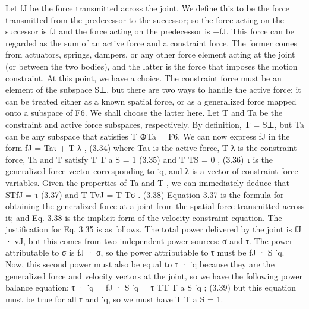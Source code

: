 Let fJ be the force transmitted across the joint. We define this to be the force transmitted from the predecessor to the successor; so the force acting on the successor is fJ and the force acting on the predecessor is −fJ. This force can be regarded as the sum of an active force and a constraint force. The former comes from actuators, springs, dampers, or any other force element acting at the joint (or between the two bodies), and the latter is the force that imposes the motion constraint. At this point, we have a choice. The constraint force must be an element of the subspace S⊥, but there are two ways to handle the active force: it can be treated either as a known spatial force, or as a generalized force mapped onto a subspace of F6. We shall choose the latter here. Let T and Ta be the constraint and active force subspaces, respectively. By definition, T = S⊥, but Ta can be any subspace that satisfies T ⊕Ta = F6. We can now express fJ in the form fJ = Taτ + T λ , (3.34) where Taτ is the active force, T λ is the constraint force, Ta and T satisfy T T a S = 1 (3.35) and T TS = 0 , (3.36) τ is the generalized force vector corresponding to ˙q, and λ is a vector of constraint force variables. Given the properties of Ta and T , we can immediately deduce that STfJ = τ (3.37) and T TvJ = T Tσ . (3.38) Equation 3.37 is the formula for obtaining the generalized force at a joint from the spatial force transmitted across it; and Eq. 3.38 is the implicit form of the velocity constraint equation. The justification for Eq. 3.35 is as follows. The total power delivered by the joint is fJ · vJ, but this comes from two independent power sources: σ and τ. The power attributable to σ is fJ · σ, so the power attributable to τ must be fJ · S ˙q. Now, this second power must also be equal to τ · ˙q because they are the generalized force and velocity vectors at the joint, so we have the following power balance equation: τ · ˙q = fJ · S ˙q = τ TT T a S ˙q ; (3.39) but this equation must be true for all τ and ˙q, so we must have T T a S = 1.

